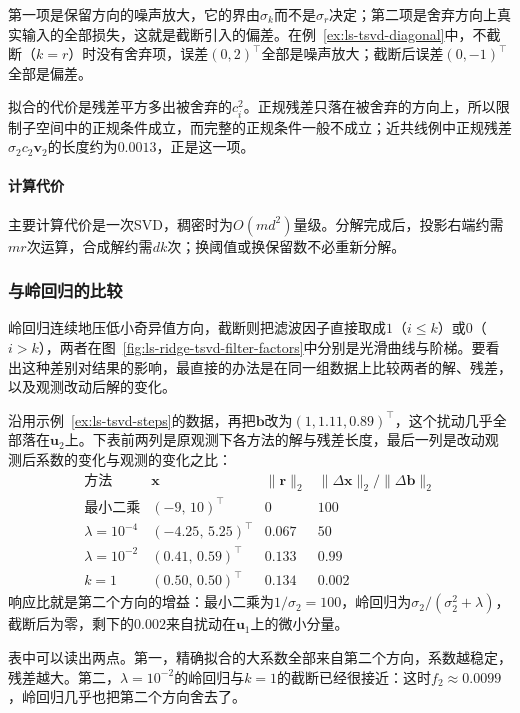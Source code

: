 第一项是保留方向的噪声放大，它的界由$\sigma_k$而不是$\sigma_r$决定；第二项是舍弃方向上真实输入的全部损失，这就是截断引入的偏差。在例~\ref{ex:ls-tsvd-diagonal}中，不截断（$k=r$）时没有舍弃项，误差$(0,2)^\top$全部是噪声放大；截断后误差$(0,-1)^\top$全部是偏差。

拟合的代价是残差平方多出被舍弃的$c_i^2$。正规残差只落在被舍弃的方向上，所以限制子空间中的正规条件成立，而完整的正规条件一般不成立；近共线例中正规残差$\sigma_2c_2\bm v_2$的长度约为$0.0013$，正是这一项。

\paragraph{计算代价}
主要计算代价是一次SVD，稠密时为$O(md^2)$量级。分解完成后，投影右端约需$mr$次运算，合成解约需$dk$次；换阈值或换保留数不必重新分解。

\subsubsection{与岭回归的比较}
岭回归连续地压低小奇异值方向，截断则把滤波因子直接取成$1$（$i\leq k$）或$0$（$i>k$），两者在图~\ref{fig:ls-ridge-tsvd-filter-factors}中分别是光滑曲线与阶梯。要看出这种差别对结果的影响，最直接的办法是在同一组数据上比较两者的解、残差，以及观测改动后解的变化。

\begin{example}[岭回归与截断SVD的比较]
\label{ex:ls-regularization-response}
沿用示例~\ref{ex:ls-tsvd-steps}的数据，再把$\bm b$改为$(1,1.11,0.89)^\top$，这个扰动几乎全部落在$\bm u_2$上。下表前两列是原观测下各方法的解与残差长度，最后一列是改动观测后系数的变化与观测的变化之比：
\[
 \begin{array}{lccc}
  \text{方法} & \bm x & \lVert\bm r\rVert_2 & \lVert\Delta\bm x\rVert_2/\lVert\Delta\bm b\rVert_2\\[2pt]
  \text{最小二乘} & (-9,\,10)^\top & 0 & 100\\
  \lambda=10^{-4} & (-4.25,\,5.25)^\top & 0.067 & 50\\
  \lambda=10^{-2} & (0.41,\,0.59)^\top & 0.133 & 0.99\\
  k=1 & (0.50,\,0.50)^\top & 0.134 & 0.002
 \end{array}
\]
响应比就是第二个方向的增益：最小二乘为$1/\sigma_2=100$，岭回归为$\sigma_2/(\sigma_2^2+\lambda)$，截断后为零，剩下的$0.002$来自扰动在$\bm u_1$上的微小分量。
\end{example}

表中可以读出两点。第一，精确拟合的大系数全部来自第二个方向，系数越稳定，残差越大。第二，$\lambda=10^{-2}$的岭回归与$k=1$的截断已经很接近：这时$f_2\approx0.0099$，岭回归几乎也把第二个方向舍去了。

